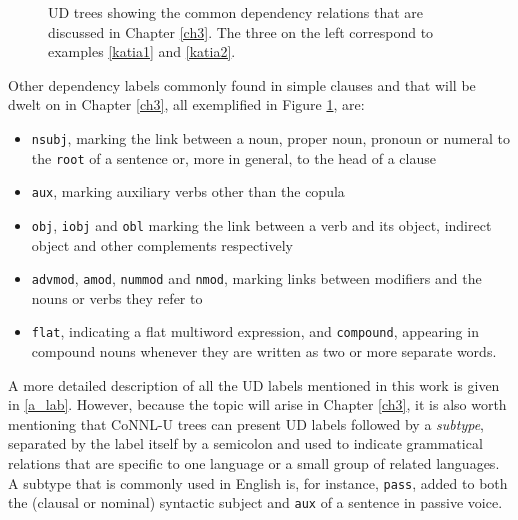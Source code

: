 \begin{figure}[h]
   \caption[UD trees showing the common dependency relations that are discussed in Chapter \ref{ch3}]{UD trees showing the common dependency relations that are discussed in Chapter \ref{ch3}. The three on the left correspond to examples \ref{katia1} and \ref{katia2}.}
    \label{katia}
\end{figure}

Other dependency labels commonly found in simple clauses and that will be dwelt on in Chapter \ref{ch3}, all exemplified in Figure \ref{katia}, are: \smallskip
\begin{itemize}
    \item \texttt{nsubj}, marking the link between a noun, proper noun, pronoun or numeral to the \texttt{root} of a sentence or, more in general, to the head of a clause
    \item \texttt{aux}, marking auxiliary verbs other than the copula
    \item \texttt{obj}, \texttt{iobj} and \texttt{obl} marking the link between a verb and its object, indirect object and other complements respectively
    \item \texttt{advmod}, \texttt{amod}, \texttt{nummod} and \texttt{nmod}, marking links between modifiers and the nouns or verbs they refer to
    \item \texttt{flat}, indicating a flat multiword expression, and \texttt{compound}, appearing in compound nouns whenever they are written as two or more separate words.
\end{itemize} \smallskip

A more detailed description of all the UD labels mentioned in this work is given in \ref{a_lab}. 
However, because the topic will arise in Chapter \ref{ch3}, it is also worth mentioning that CoNNL-U trees can present UD labels followed by a \textit{subtype}, separated by the label itself by a semicolon and used to indicate grammatical relations that are specific to one language or a small group of related languages. A subtype that is commonly used in English is, for instance, \texttt{pass}, added to both the (clausal or nominal) syntactic subject and \texttt{aux} of a sentence in passive voice.

